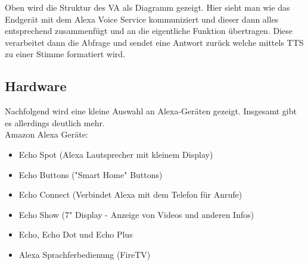 Oben wird die Struktur des VA als Diagramm gezeigt. Hier sieht man wie das Endgerät mit dem Alexa Voice Service kommuniziert und dieser dann alles entsprechend zusammenfügt und an die eigentliche Funktion übertragen. Diese verarbeitet dann die Abfrage und sendet eine Antwort zurück welche mittels TTS zu einer Stimme formatiert wird.

\subsection{Hardware}
Nachfolgend wird eine kleine Auswahl an Alexa-Geräten gezeigt. Insgesamt gibt es allerdings deutlich mehr.\\

Amazon Alexa Geräte:
\begin{itemize}
	\item Echo Spot (Alexa Lautsprecher mit kleinem Display)
	\item Echo Buttons ("Smart Home" Buttons)
	\item Echo Connect (Verbindet Alexa mit dem Telefon für Anrufe)
	\item Echo Show (7" Display - Anzeige von Videos und anderen Infos)
	\item Echo, Echo Dot und Echo Plus
	\item Alexa Sprachferbedienung (FireTV)
\end{itemize}

